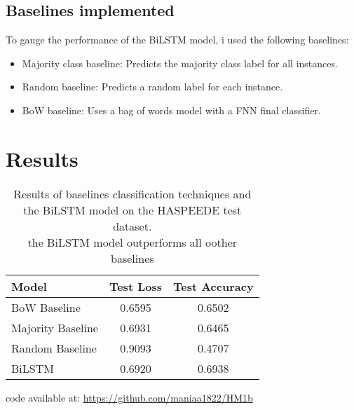 \documentclass[11pt,a4paper]{article}
\begin{document}
\subsection{Baselines implemented}
To gauge the performance of the BiLSTM model, i used the following baselines:
\begin{itemize}
    \item Majority class baseline: Predicts the majority class label for all instances.
    \item Random baseline: Predicts a random label for each instance.
    \item BoW baseline: Uses a bag of words model with a FNN final classifier.
\end{itemize}
\section{Results}
\begin{table}[h!]
\centering
\begin{tabular}{|l|c|c|}
\hline
\textbf{Model} & \textbf{Test Loss} & \textbf{Test Accuracy} \\
\hline
BoW Baseline & 0.6595 & 0.6502 \\
\hline
Majority Baseline & 0.6931 & 0.6465 \\
\hline
Random Baseline & 0.9093 & 0.4707 \\
\hline
BiLSTM & 0.6920 & 0.6938 \\
\hline
\end{tabular}
\caption{Results of baselines classification techniques and the BiLSTM model on the HASPEEDE test dataset.\\the BiLSTM model outperforms all oother baselines}
\label{tab:results}
\end{table}



code available at: \url{https://github.com/maniaa1822/HM1b}
\end{document}
